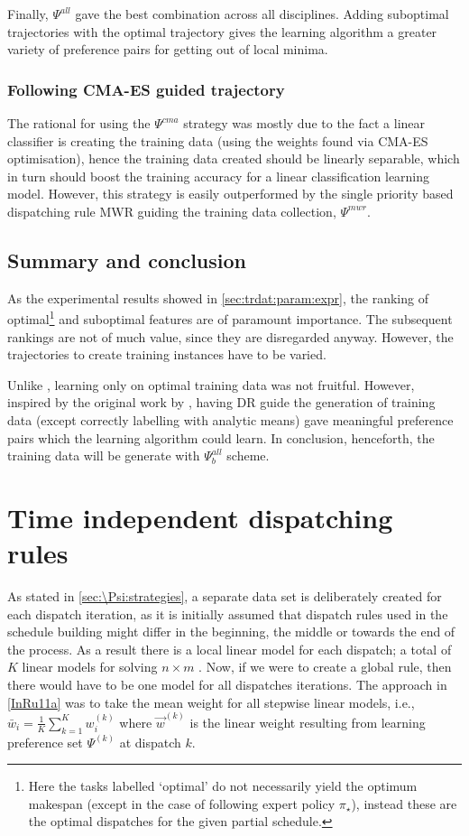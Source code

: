Finally, $\Psi^{all}$ gave the best combination across all disciplines. Adding 
suboptimal trajectories with the optimal trajectory gives the learning 
algorithm a greater variety of preference pairs for getting out of local minima.

\subsubsection{Following CMA-ES guided trajectory}
The rational for using the $\Psi^{cma}$ strategy was mostly due to the fact a 
linear classifier is creating the training data (using the weights found via 
CMA-ES optimisation), hence the training data created should be linearly 
separable, which in turn should boost the training accuracy for a linear 
classification learning model. However, this strategy is easily outperformed by 
the single priority based dispatching rule MWR guiding the training data 
collection, $\Psi^{mwr}$. 


\subsection{Summary and conclusion}
As the experimental results showed in \cref{sec:trdat:param:expr}, the ranking 
of optimal\footnote{Here the tasks labelled `optimal' do not necessarily yield 
    the optimum makespan (except in the case of following expert policy 
    $\pi_\star$), instead these are the optimal dispatches for the given 
    partial schedule.} 
and suboptimal features are of paramount importance. The subsequent rankings 
are not of much value, since they are disregarded anyway. However, the 
trajectories to create training instances have to be varied.

Unlike \citep{Siggi10,Malik08,Russell09}, learning only on optimal training 
data was not fruitful. However, inspired by the original work by 
\cite{Siggi05}, having DR guide the generation of training data (except 
correctly labelling with analytic means) gave meaningful preference pairs which 
the learning algorithm could learn. In conclusion, henceforth, the training 
data will be generate with $\Psi_{b}^{all}$ scheme.



\section{Time independent dispatching rules}\label{sec:pref:scalability}
As stated in \cref{sec:\Psi:strategies}, a separate data set is deliberately 
created for each dispatch iteration, as it is initially assumed that dispatch 
rules used in the schedule building might differ in the beginning, the middle 
or towards the end of the process. As a result there is a local linear model 
for each dispatch; a total of $K$ linear models for solving $n\times m$ 
\jsp. Now, if we were to create a global rule, then there would have to be one 
model for all dispatches iterations. The approach in \cref{InRu11a} was to take 
the mean weight for all stepwise linear models, i.e., 
$\bar{w}_i=\frac{1}{K}\sum_{k=1}^K w_i^{(k)}$ where $\vec{w}^{(k)}$ is 
the linear weight resulting from learning preference set $\Psi^{(k)}$ at 
dispatch $k$. 

